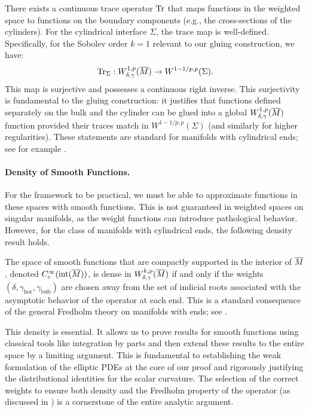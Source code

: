 \begin{theorem}
There exists a continuous trace operator $\mathrm{Tr}$ that maps functions in the weighted space to functions on the boundary components (e.g., the cross-sections of the cylinders). For the cylindrical interface $\Sigma$, the trace map is well-defined. Specifically, for the Sobolev order $k=1$ relevant to our gluing construction, we have:
\begin{equation}
    \mathrm{Tr}_\Sigma: W^{1,p}_{\delta, \gamma}(\overline{M}) \to W^{1-1/p, p}(\Sigma).
\end{equation}
This map is surjective and possesses a continuous right inverse. This surjectivity is fundamental to the gluing construction: it justifies that functions defined separately on the bulk and the cylinder can be glued into a global $W^{1,p}_{\delta,\gamma}(\overline{M})$ function provided their traces match in $W^{1-1/p, p}(\Sigma)$ (and similarly for higher regularities). These statements are standard for manifolds with cylindrical ends; see for example \cite{lockhartmccowen1985,melrose1996}.
\end{theorem}

\paragraph{Density of Smooth Functions.}
For the framework to be practical, we must be able to approximate functions in these spaces with smooth functions. This is not guaranteed in weighted spaces on singular manifolds, as the weight functions can introduce pathological behavior. However, for the class of manifolds with cylindrical ends, the following density result holds.

\begin{proposition}
The space of smooth functions that are compactly supported in the interior of $\overline{M}$, denoted $C^\infty_c(\text{int}(\overline{M}))$, is dense in $W^{k,p}_{\delta, \gamma}(\overline{M})$ if and only if the weights $(\delta, \gamma_{\mathrm{hor}}, \gamma_{\mathrm{bub}})$ are chosen away from the set of indicial roots associated with the asymptotic behavior of the operator at each end. This is a standard consequence of the general Fredholm theory on manifolds with ends; see \cite{lockhartmccowen1985,melrose1996}.
\end{proposition}

This density is essential. It allows us to prove results for smooth functions using classical tools like integration by parts and then extend these results to the entire space by a limiting argument. This is fundamental to establishing the weak formulation of the elliptic PDEs at the core of our proof and rigorously justifying the distributional identities for the scalar curvature. The selection of the correct weights to ensure both density and the Fredholm property of the operator (as discussed in ) is a cornerstone of the entire analytic argument.

